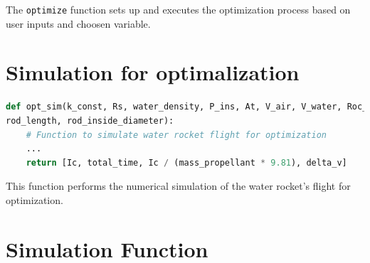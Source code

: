 \documentclass{report}
\begin{document}

The \texttt{optimize} function sets up and executes the optimization process based on user inputs and choosen variable.

\section{Simulation for optimalization}

\begin{lstlisting}[language=Python]
def opt_sim(k_const, Rs, water_density, P_ins, At, V_air, V_water, Roc_mass, T, 
rod_length, rod_inside_diameter):
    # Function to simulate water rocket flight for optimization
    ...
    return [Ic, total_time, Ic / (mass_propellant * 9.81), delta_v]
\end{lstlisting}

This function performs the numerical simulation of the water rocket's flight for optimization.


\section{Simulation Function}
\end{document}
